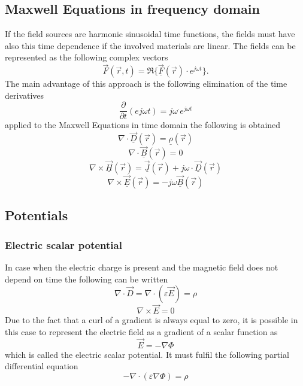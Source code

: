 \subsection{Maxwell Equations in frequency domain}
If the field sources are harmonic sinusoidal time functions, the fields must have also this time dependence if the involved materials are linear. The fields can be represented as the following complex vectors
\begin{equation*}
	\vec{F}\left(\vec{r},t\right) = \Re\{\underline{\vec{F}}\left(\vec{r}\right) \cdot e^{j\omega t}\}.
\end{equation*}
The main advantage of this approach is the following elimination of the time derivatives
\begin{equation*}
	\frac{\partial}{\partial t}\left(e{j \omega t}\right) = j \omega^\cdot e^{j \omega t}
\end{equation*}
applied to the Maxwell Equations in time domain the following is obtained
\begin{equation*}
	\nabla \cdot \underline{\vec{D}}\left(\vec{r}\right) = \underline{\rho}\left(\vec{r}\right)
\end{equation*}
\begin{equation*}
	\nabla \cdot \underline{\vec{B}}\left(\vec{r}\right) = 0
\end{equation*}
\begin{equation*}
	\nabla \times \underline{\vec{H}}\left(\vec{r}\right) = \underline{\vec{J}}\left(\vec{r}\right) + j \omega \cdot \underline{\vec{D}}\left(\vec{r}\right)
\end{equation*}
\begin{equation*}
	\nabla \times \underline{\vec{E}}\left(\vec{r}\right) = - j\omega \underline{\vec{B}}\left(\vec{r}\right)
\end{equation*}

\subsection{Potentials}
\subsubsection{Electric scalar potential}
In case when the electric charge is present and the magnetic field does not depend on time the following can be written
\begin{equation*}
	\nabla \cdot \vec{D} = \nabla \cdot \left(\varepsilon \vec{E}\right) = \rho
\end{equation*}
\begin{equation*}
	\nabla \times \vec{E} = 0
\end{equation*}
Due to the fact that a curl of a gradient is always equal to zero, it is possible in this case to represent the electric field as a gradient of a scalar function as
\begin{equation*}
	\vec{E} = -\nabla \Phi
\end{equation*}
which is called the electric scalar potential. It must fulfil the following partial differential equation
\begin{equation*}
	-\nabla \cdot \left(\varepsilon \nabla \Phi\right) = \rho
\end{equation*}

